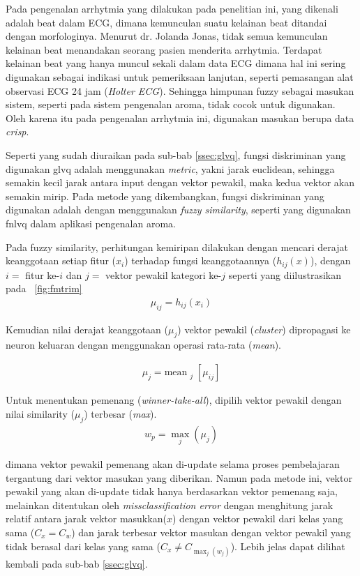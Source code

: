 Pada pengenalan arrhytmia yang dilakukan pada penelitian ini, yang dikenali
adalah beat dalam ECG, dimana kemunculan suatu kelainan beat ditandai dengan
morfologinya. Menurut dr. Jolanda Jonas, tidak semua kemunculan kelainan beat
menandakan seorang pasien menderita arrhytmia. Terdapat kelainan beat yang hanya muncul
sekali dalam data ECG dimana hal ini sering digunakan sebagai indikasi untuk
pemeriksaan lanjutan, seperti pemasangan alat observasi ECG 24 jam
(\emph{Holter ECG}). Sehingga himpunan fuzzy sebagai masukan
sistem, seperti pada sistem pengenalan aroma, tidak cocok untuk digunakan. Oleh
karena itu pada pengenalan arrhytmia ini, digunakan masukan berupa data
\emph{crisp}.
 
Seperti yang sudah diuraikan pada sub-bab \ref{ssec:glvq}, fungsi
diskriminan yang digunakan \gls{glvq} adalah menggunakan \emph{\gls{metric}}, 
yakni jarak euclidean, sehingga semakin kecil jarak antara input dengan vektor
pewakil, maka kedua vektor akan semakin mirip. Pada metode yang dikembangkan,
fungsi diskriminan yang digunakan adalah dengan menggunakan \emph{fuzzy similarity},
seperti yang digunakan \gls{fnlvq} dalam aplikasi pengenalan aroma.


Pada fuzzy similarity, perhitungan kemiripan dilakukan dengan mencari derajat
keanggotaan setiap fitur ($x_i$) terhadap fungsi keanggotaannya ($h_{ij}(x)$), 
dengan $i=$ fitur ke-$i$ dan $j=$ vektor pewakil kategori ke-$j$ seperti yang
diilustrasikan pada \pic~\ref{fig:fmtrim}
\begin{align}
	\mu_{ij} = h_{ij}(x_i)
\end{align}

Kemudian nilai derajat keanggotaan ($\mu_{j}$) vektor pewakil
(\emph{cluster}) dipropagasi ke neuron keluaran dengan menggunakan operasi
rata-rata (\emph{mean}).

\begin{align}
	\mu_j = \text{mean}_{\substack{j}} [\mu_{ij}]
\end{align}

Untuk menentukan pemenang (\emph{winner-take-all}), dipilih vektor
pewakil dengan nilai similarity ($\mu_j$) terbesar (\emph{max}).  
\begin{align}
	w_p = \max_j ( \mu_j )
\end{align}

dimana vektor pewakil pemenang akan di-update selama proses pembelajaran 
tergantung dari vektor masukan yang diberikan. Namun pada metode ini, vektor
pewakil yang akan di-update tidak hanya berdasarkan vektor pemenang saja,
melainkan ditentukan oleh \emph{missclassification error} dengan menghitung
jarak relatif antara jarak vektor masukkan($x$) dengan vektor pewakil dari
kelas yang sama ($C_x = C_w$) dan jarak terbesar vektor masukan dengan vektor
pewakil yang tidak berasal dari kelas yang sama ($C_x \neq C_{\max_{j}(w_j)}$).
Lebih jelas dapat dilihat kembali pada sub-bab \ref{ssec:glvq}.


